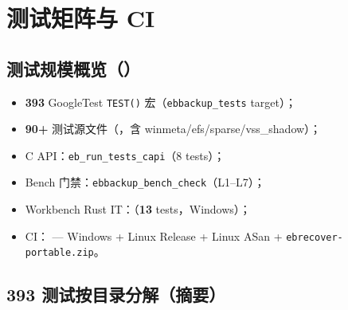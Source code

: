 \chapter{测试矩阵与 CI}
\label{ch:test-ci}

\section{测试规模概览（）}

\begin{itemize}[nosep]
  \item \textbf{393} GoogleTest \texttt{TEST()} 宏（\texttt{ebbackup\_tests} target）；
  \item \textbf{90+} 测试源文件（，含 winmeta/efs/sparse/vss\_shadow）；
  \item C API：\texttt{eb\_run\_tests\_capi}（8 tests）；
  \item Bench 门禁：\texttt{ebbackup\_bench\_check}（L1--L7）；
  \item Workbench Rust IT：（\textbf{13} tests，Windows）；
  \item CI： — Windows + Linux Release + Linux ASan + \texttt{ebrecover-portable.zip}。
\end{itemize}

\section{393 测试按目录分解（摘要）}

